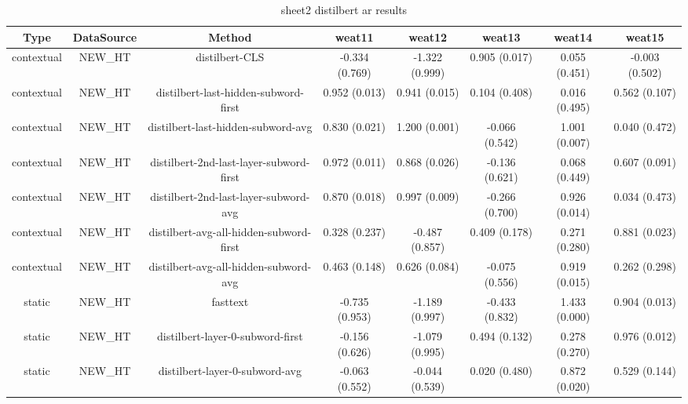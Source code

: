 \begin{sidewaystable}[htb]
    \centering
    \caption{sheet2 distilbert ar results}
    \label{appendix_tab:sheet2_distilbert_ar_results}
    \small
    \begin{tabular}{@{}cccccccc@{}}
        \toprule
        Type & DataSource & Method & weat11 & weat12 & weat13 & weat14 & weat15 \\
        \midrule
        contextual & NEW\_HT & distilbert-CLS & -0.334 (0.769) & -1.322 (0.999) & 0.905 (0.017) & 0.055 (0.451) & -0.003 (0.502) \\
        contextual & NEW\_HT & distilbert-last-hidden-subword-first & 0.952 (0.013) & 0.941 (0.015) & 0.104 (0.408) & 0.016 (0.495) & 0.562 (0.107) \\
        contextual & NEW\_HT & distilbert-last-hidden-subword-avg & 0.830 (0.021) & 1.200 (0.001) & -0.066 (0.542) & 1.001 (0.007) & 0.040 (0.472) \\
        contextual & NEW\_HT & distilbert-2nd-last-layer-subword-first & 0.972 (0.011) & 0.868 (0.026) & -0.136 (0.621) & 0.068 (0.449) & 0.607 (0.091) \\
        contextual & NEW\_HT & distilbert-2nd-last-layer-subword-avg & 0.870 (0.018) & 0.997 (0.009) & -0.266 (0.700) & 0.926 (0.014) & 0.034 (0.473) \\
        contextual & NEW\_HT & distilbert-avg-all-hidden-subword-first & 0.328 (0.237) & -0.487 (0.857) & 0.409 (0.178) & 0.271 (0.280) & 0.881 (0.023) \\
        contextual & NEW\_HT & distilbert-avg-all-hidden-subword-avg & 0.463 (0.148) & 0.626 (0.084) & -0.075 (0.556) & 0.919 (0.015) & 0.262 (0.298) \\
        static & NEW\_HT & fasttext & -0.735 (0.953) & -1.189 (0.997) & -0.433 (0.832) & 1.433 (0.000) & 0.904 (0.013) \\
        static & NEW\_HT & distilbert-layer-0-subword-first & -0.156 (0.626) & -1.079 (0.995) & 0.494 (0.132) & 0.278 (0.270) & 0.976 (0.012) \\
        static & NEW\_HT & distilbert-layer-0-subword-avg & -0.063 (0.552) & -0.044 (0.539) & 0.020 (0.480) & 0.872 (0.020) & 0.529 (0.144) \\
        \bottomrule
    \end{tabular}
\end{sidewaystable}